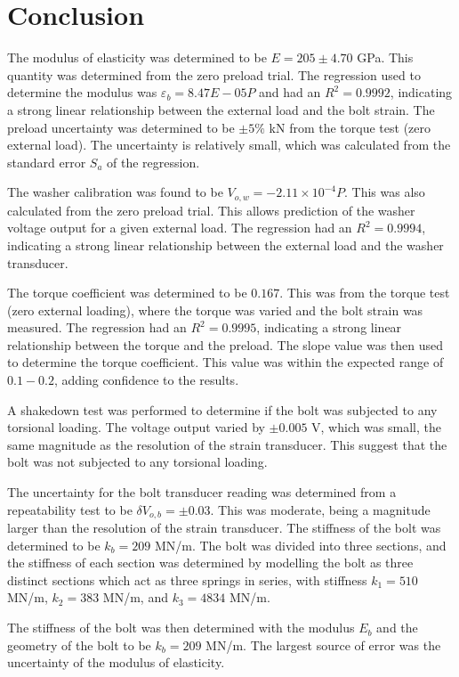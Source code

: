 \section{Conclusion}
The modulus of elasticity was determined to be $E = 205 \pm 4.70$ GPa. This quantity was determined from the zero preload trial. The regression used to determine the modulus was $\varepsilon_{b} = 8.47E-05 P$ and had an $R^2 = 0.9992$, indicating a strong linear relationship between the external load and the bolt strain. The preload uncertainty was determined to be $\pm 5\%$ kN from the torque test (zero external load). The uncertainty is relatively small, which was calculated from the standard error $S_{a}$ of the regression.

The washer calibration was found to be $V_{o, w} = -2.11 \times 10^{-4}P$. This was also calculated from the zero preload trial. This allows prediction of the washer voltage output for a given external load. The regression had an $R^2 = 0.9994$, indicating a strong linear relationship between the external load and the washer transducer.

The torque coefficient was determined to be $0.167$. This was from the torque test (zero external loading), where the torque was varied and the bolt strain was measured. The regression had an $R^2 = 0.9995$, indicating a strong linear relationship between the torque and the preload. The slope value was then used to determine the torque coefficient. This value was within the expected range of $0.1 - 0.2$, adding confidence to the results.

A shakedown test was performed to determine if the bolt was subjected to any torsional loading. The voltage output varied by $\pm 0.005$ V, which was small, the same magnitude as the resolution of the strain transducer. This suggest that the bolt was not subjected to any torsional loading. 

The uncertainty for the bolt transducer reading was determined from a repeatability test to be $\delta V_{o, b} =\pm 0.03$. This was moderate, being a magnitude larger than the resolution of the strain transducer. 
The stiffness of the bolt was determined to be $k_b = 209$ MN/m. The bolt was divided into three sections, and the stiffness of each section was determined by modelling the bolt as three distinct sections which act as three springs in series, with stiffness $k_1 = 510$ MN/m, $k_2 = 383$ MN/m, and $k_3 = 4834$ MN/m. 

The stiffness of the bolt was then determined with the modulus $E_b$ and the geometry of the bolt to be $k_b = 209$ MN/m. The largest source of error was the uncertainty of the modulus of elasticity.

